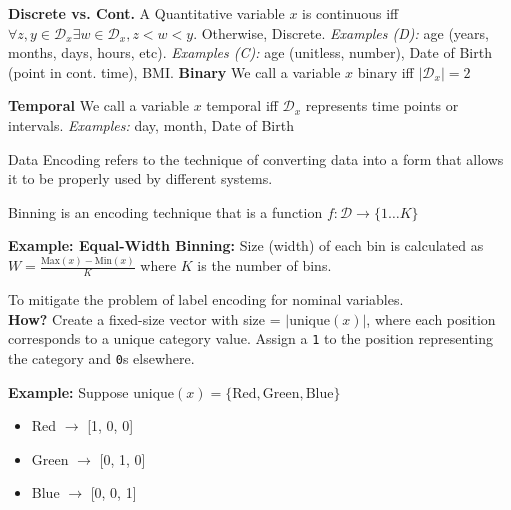 \documentclass{article}
\begin{document}
\textbf{Discrete vs. Cont.}
A Quantitative variable $x$ is continuous iff $\forall z,y \in \mathcal{D}_x \exists w \in \mathcal{D}_x, z<w<y$. Otherwise, Discrete.
\textit{Examples (D): }age (years, months, days, hours, etc).
\textit{Examples (C): }age (unitless, number), Date of Birth (point in cont. time), BMI.
\textbf{Binary} We call a variable $x$ binary iff $|\mathcal{D}_x|=2$

\textbf{Temporal} We call a variable $x$ temporal iff $\mathcal{D}_x$ represents time points or intervals. \textit{Examples:} day, month, Date of Birth


Data Encoding refers to the technique of converting data into a form that allows it to be properly used by different systems.

Binning is an encoding technique that is a function $f : \mathcal{D} \to \{1 \dots K\}$

\textbf{Example: Equal-Width Binning:} Size (width) of each bin is calculated as $W = \frac{\text{Max}(x)-\text{Min}(x)}{K}$ where $K$ is the number of bins.

To mitigate the problem of label encoding for nominal variables.\\
\textbf{How?} Create a fixed-size vector with size = $|\text{unique}(x)|$, where each position corresponds to a unique category value. Assign a \texttt{1} to the position representing the category and \texttt{0}s elsewhere.

\textbf{Example:}
Suppose $\text{unique}(x) = \{\text{Red}, \text{Green}, \text{Blue}\}$

\begin{itemize}
    \item Red $\rightarrow$ [1, 0, 0]
    \item Green $\rightarrow$ [0, 1, 0]
    \item Blue $\rightarrow$ [0, 0, 1]
\end{itemize}

\end{document}

